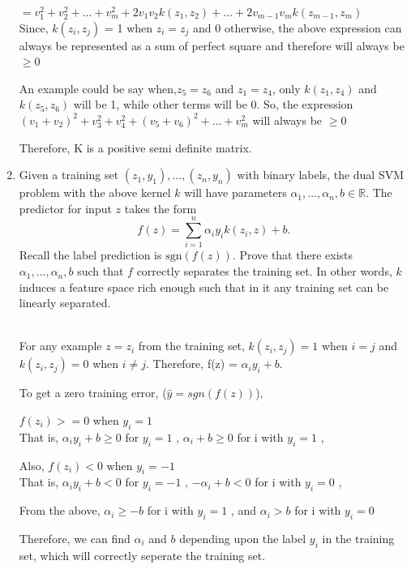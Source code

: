 \documentclass[a4paper]{article}
\theoremstyle{definition}
\newcommand{\sgn}{\mathrm{sgn}}
\def\R{\mathbb R}
\newenvironment{soln}{
    \leavevmode\color{blue}\ignorespaces
}{}
\begin{document}
\begin{enumerate}
\begin{soln}
$ = v_1^2 + v_2^2 +...+ v_m^2 + 2v_1v_2k(z_1,z_2) + ... + 2v_{m-1}v_mk(z_{m-1},z_m)$ \\
Since, $k(z_i, z_j) $ = 1 when $z_i = z_j$ and 0 otherwise, the above expression can always be represented as a sum of perfect square and therefore will always be $\geq 0$

An example could be say when,$z_5 = z_6$ and $z_1 = z_4 $, only $k(z_1,z_4)$ and $k(z_5, z_6)$ will be 1, while other terms will be 0.
So, the expression $(v_1 + v_2)^2 + v_3^2 + v_4^2 + (v_5 + v_6)^2 + ... + v_m^2 $ will always be $\geq 0$

Therefore, K is a positive semi definite matrix.

\end{soln}





\item Given a training set $(z_1, y_1), \ldots, (z_n, y_n)$ with binary labels, the dual SVM problem with the above kernel $k$ will have parameters $\alpha_1, \ldots, \alpha_n, b \in \R$.  The predictor for input $z$ takes the form
$$f(z) = \sum_{i=1}^n \alpha_i y_i k(z_i, z) + b.$$
Recall the label prediction is $\sgn(f(z))$.
Prove that there exists $\alpha_1, \ldots, \alpha_n, b$ such that $f$ correctly separates the training set.
In other words, $k$ induces a feature space rich enough such that in it any training set can be linearly separated.

\begin{soln}
\\For any example $z = z_i$ from the training set, $k(z_i, z_j) = 1$ when $i=j$ and $k(z_i, z_j) = 0$ when $i \neq j$. Therefore, f(z) = $\alpha_i y_i + b.$ 

To get a zero training error, ($\hat y = sgn(f(z))$),


$f(z_i)>=0$ when $y_i = 1$ 
\\That is, $\alpha_i y_i + b \ge 0$ for $y_i = 1$ ,
$\alpha_i + b \ge 0$ for i with $y_i = 1$ ,


 Also, $f(z_i)<0$ when $y_i = -1$  
\\That is, $\alpha_i y_i + b < 0$  for $y_i = -1$ ,
 $ - \alpha_i + b < 0$ for i with $y_i = 0$ ,

From the above, $\alpha_i  \ge - b$ for i with $y_i = 1$ , and $\alpha_i  > b$ for i with $y_i = 0$

Therefore, we can find $\alpha_i$ and $b$ depending upon the label $y_i$ in the training set, which will correctly seperate the training set.


\end{soln}
\end{enumerate}
\end{document}
